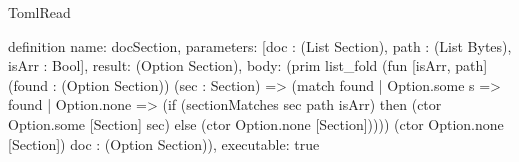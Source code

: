 \begin{lexlean}{TomlRead}
\begin{semanticmodule}
definition{
  name: docSection,
  parameters: [doc : (List Section), path : (List Bytes), isArr : Bool],
  result: (Option Section),
  body: (prim list_fold (fun [isArr, path] (found : (Option Section)) (sec : Section) => (match found
    | Option.some s => found
    | Option.none => (if (sectionMatches sec path isArr) then (ctor Option.some [Section] sec) else (ctor Option.none [Section])))) (ctor Option.none [Section]) doc : (Option Section)),
  executable: true
}
\end{semanticmodule}
\end{lexlean}
